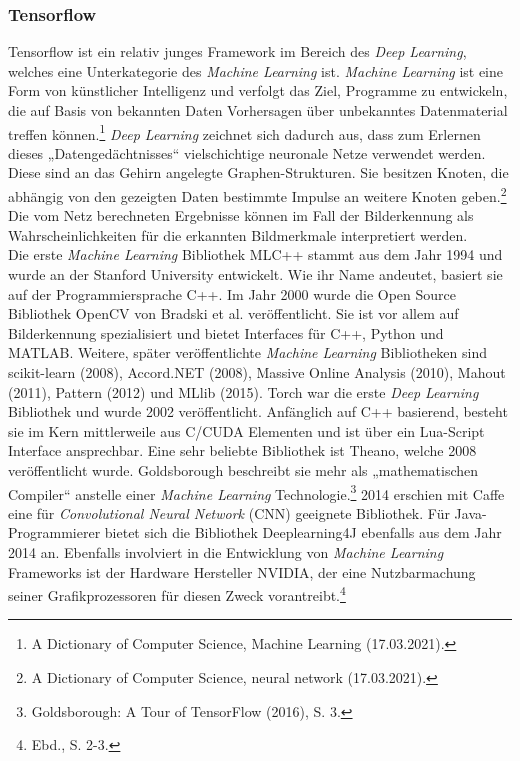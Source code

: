 \documentclass[a4paper,12pt,ngerman]{article}
\begin{document}
\subsubsection{Tensorflow}
Tensorflow ist ein relativ junges Framework im Bereich des \textit{Deep Learning}, welches eine Unterkategorie des \textit{Machine Learning} ist. \textit{Machine Learning} ist eine Form von künstlicher Intelligenz und verfolgt das Ziel, Programme zu entwickeln, die auf Basis von bekannten Daten Vorhersagen über unbekanntes Datenmaterial treffen können.\footnote{A Dictionary of Computer Science, Machine Learning (17.03.2021).}  \textit{Deep Learning} zeichnet sich dadurch aus, dass zum Erlernen dieses „Datengedächtnisses“ vielschichtige neuronale Netze verwendet werden. Diese sind an das Gehirn angelegte Graphen-Strukturen. Sie besitzen Knoten, die abhängig von den gezeigten Daten bestimmte Impulse an weitere Knoten geben.\footnote{A Dictionary of Computer Science, neural network (17.03.2021).} Die vom Netz berechneten Ergebnisse können im Fall der Bilderkennung als Wahrscheinlichkeiten für die erkannten Bildmerkmale interpretiert werden. \\
Die erste \textit{Machine Learning} Bibliothek MLC++ stammt aus dem Jahr 1994 und wurde an der Stanford University entwickelt. Wie ihr Name andeutet, basiert sie auf der Programmiersprache C++. Im Jahr 2000 wurde die Open Source Bibliothek OpenCV von Bradski et al. veröffentlicht. Sie ist vor allem auf Bilderkennung spezialisiert und bietet Interfaces für C++, Python und MATLAB. Weitere, später veröffentlichte \textit{Machine Learning} Bibliotheken sind scikit-learn (2008), Accord.NET (2008), Massive Online Analysis (2010), Mahout (2011), Pattern (2012) und MLlib (2015). Torch war die erste \textit{Deep Learning} Bibliothek und wurde 2002 veröffentlicht. Anfänglich auf C++ basierend, besteht sie im Kern mittlerweile aus C/CUDA Elementen und ist über ein Lua-Script Interface ansprechbar. Eine sehr beliebte Bibliothek ist Theano, welche 2008 veröffentlicht wurde. Goldsborough beschreibt sie mehr als „mathematischen Compiler“ anstelle einer \textit{Machine Learning} Technologie.\footnote{Goldsborough: A Tour of TensorFlow (2016), S. 3.}  2014 erschien mit Caffe eine für \textit{Convolutional Neural Network} (CNN) geeignete Bibliothek. Für Java-Programmierer bietet sich die Bibliothek Deeplearning4J ebenfalls aus dem Jahr 2014 an. Ebenfalls involviert in die Entwicklung von \textit{Machine Learning} Frameworks ist der Hardware Hersteller NVIDIA, der eine Nutzbarmachung seiner Grafikprozessoren für diesen Zweck vorantreibt.\footnote{Ebd., S. 2-3.} \\
\end{document}
